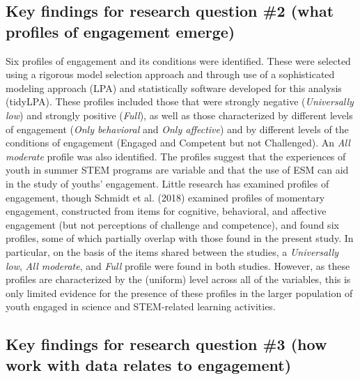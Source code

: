 \documentclass[]{msu-thesis}
\theoremstyle{definition}
\theoremstyle{definition}
\theoremstyle{definition}
\theoremstyle{remark}
\begin{document}
\subsection{Key findings for research question \#2 (what profiles of
engagement
emerge)}\label{key-findings-for-research-question-2-what-profiles-of-engagement-emerge}

Six profiles of engagement and its conditions were identified. These
were selected using a rigorous model selection approach and through use
of a sophisticated modeling approach (LPA) and statistically software
developed for this analysis (tidyLPA). These profiles included those
that were strongly negative (\emph{Universally low}) and strongly
positive (\emph{Full}), as well as those characterized by different
levels of engagement (\emph{Only behavioral} and \emph{Only affective})
and by different levels of the conditions of engagement (Engaged and
Competent but not Challenged). An \emph{All moderate} profile was also
identified. The profiles suggest that the experiences of youth in summer
STEM programs are variable and that the use of ESM can aid in the study
of youths' engagement. Little research has examined profiles of
engagement, though Schmidt et al. (2018) examined profiles of momentary
engagement, constructed from items for cognitive, behavioral, and
affective engagement (but not perceptions of challenge and competence),
and found six profiles, some of which partially overlap with those found
in the present study. In particular, on the basis of the items shared
between the studies, a \emph{Universally low}, \emph{All moderate}, and
\emph{Full} profile were found in both studies. However, as these
profiles are characterized by the (uniform) level across all of the
variables, this is only limited evidence for the presence of these
profiles in the larger population of youth engaged in science and
STEM-related learning activities.

\subsection{Key findings for research question \#3 (how work with data
relates to
engagement)}\label{key-findings-for-research-question-3-how-work-with-data-relates-to-engagement}
\end{document}
